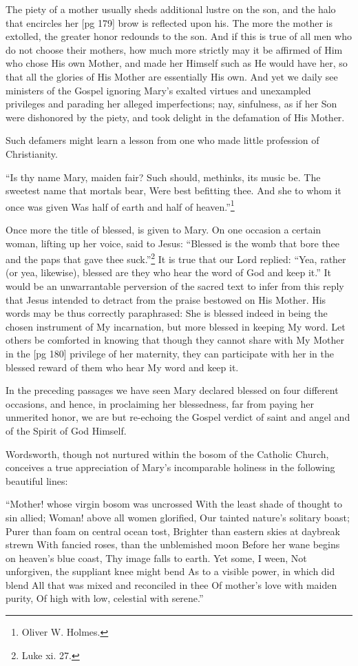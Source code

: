 The piety of a mother usually sheds additional
lustre on the son, and the halo that encircles her
[pg 179]
brow is reflected upon his. The more the mother
is extolled, the greater honor redounds to the
son. And if this is true of all men who do not
choose their mothers, how much more strictly may
it be affirmed of Him who chose His own Mother,
and made her Himself such as He would have her,
so that all the glories of His Mother are essentially
His own. And yet we daily see ministers
of the Gospel ignoring Mary's exalted virtues
and unexampled privileges and parading her alleged
imperfections; nay, sinfulness, as if her Son
were dishonored by the piety, and took delight
in the defamation of His Mother.

Such defamers might learn a lesson from one
who made little profession of Christianity.

“Is thy name Mary, maiden fair?
Such should, methinks, its music be.
The sweetest name that mortals bear,
Were best befitting thee.
And she to whom it once was given
Was half of earth and half of
heaven.”\footnote{Oliver W. Holmes.}

Once more the title of blessed, is given to Mary.
On one occasion a certain woman, lifting up her
voice, said to Jesus: “Blessed is the womb that
bore thee and the paps that gave thee suck.”\footnote{Luke xi. 27.} It
is true that our Lord replied: “Yea, rather (or
yea, likewise), blessed are they who hear the word
of God and keep it.” It would be an unwarrantable
perversion of the sacred text to infer from
this reply that Jesus intended to detract from
the praise bestowed on His Mother. His words
may be thus correctly paraphrased: She is
blessed indeed in being the chosen instrument of
My incarnation, but more blessed in keeping My
word. Let others be comforted in knowing that
though they cannot share with My Mother in the
[pg 180]
privilege of her maternity, they can participate
with her in the blessed reward of them who hear
My word and keep it.

In the preceding passages we have seen Mary
declared blessed on four different occasions, and
hence, in proclaiming her blessedness, far from
paying her unmerited honor, we are but re-echoing
the Gospel verdict of saint and angel and of the
Spirit of God Himself.

Wordsworth, though not nurtured within the
bosom of the Catholic Church, conceives a true
appreciation of Mary's incomparable holiness in
the following beautiful lines:

“Mother! whose virgin bosom was uncrossed
With the least shade of thought to sin allied;
Woman! above all women glorified,
Our tainted nature's solitary boast;
Purer than foam on central ocean tost,
Brighter than eastern skies at daybreak strewn
With fancied roses, than the unblemished moon
Before her wane begins on heaven's blue coast,
Thy image falls to earth. Yet some, I ween,
Not unforgiven, the suppliant knee might bend
As to a visible power, in which did blend
All that was mixed and reconciled in thee
Of mother's love with maiden purity,
Of high with low, celestial with serene.”

